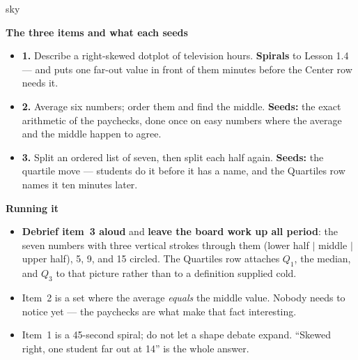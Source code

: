 \documentclass[10pt]{article}
\begin{document}
\boxguard[20]
\begin{skillbox}{sky}
\begin{minipage}[t]{0.48\linewidth}
    \textbf{The three items and what each seeds}
    \begin{itemize}
        \item \textbf{1.} Describe a right-skewed dotplot of television hours. \textbf{Spirals}
              to Lesson 1.4 --- and puts one far-out value in front of them minutes before
              the Center row needs it.
        \item \textbf{2.} Average six numbers; order them and find the middle. \textbf{Seeds:}
              the exact arithmetic of the paychecks, done once on easy numbers where the
              average and the middle happen to agree.
        \item \textbf{3.} Split an ordered list of seven, then split each half again.
              \textbf{Seeds:} the quartile move --- students do it before it has a name, and
              the Quartiles row names it ten minutes later.
    \end{itemize}
\end{minipage}
\hfill
\begin{minipage}[t]{0.48\linewidth}
    \textbf{Running it}
    \begin{itemize}
        \item \textbf{Debrief item~3 aloud} and \textbf{leave the board work up all period}:
              the seven numbers with three vertical strokes through them (lower half $|$
              middle $|$ upper half), 5, 9, and 15 circled. The Quartiles row attaches $Q_1$, the
              median, and $Q_3$ to that picture rather than to a definition supplied cold.
        \item Item~2 is a set where the average \emph{equals} the middle value. Nobody
              needs to notice yet --- the paychecks are what make that fact interesting.
        \item Item~1 is a 45-second spiral; do not let a shape debate expand. ``Skewed right,
              one student far out at 14'' is the whole answer.
    \end{itemize}
\end{minipage}
\end{skillbox}
\end{document}
